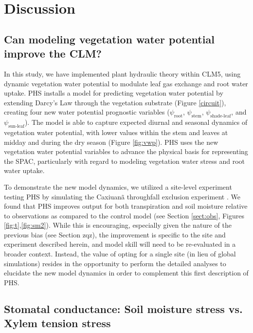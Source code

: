 \documentclass[draft,linenumbers]{agujournal}
\begin{document}
\section{Discussion}
\subsection{Can modeling vegetation water potential improve the CLM?}

    In this study, we have implemented plant hydraulic theory within CLM5, 
    using dynamic vegetation water potential to modulate leaf gas exchange and root water uptake.
    PHS installs a model for predicting vegetation water potential by extending Darcy's Law through the vegetation substrate (Figure \ref{circuit}), 
    creating four new water potential prognostic variables ($\psi_{\text{root}}$, $\psi_{\text{stem}}$, $\psi_{\text{shade-leaf}}$, and $\psi_{\text{sun-leaf}}$).  
    The model is able to capture expected diurnal and seasonal dynamics of vegetation water potential, 
    with lower values within the stem and leaves at midday and during the dry season (Figure \ref{fig:vwp}).
    PHS uses the new vegetation water potential variables to advance the physical basis for representing the SPAC, particularly with regard to modeling vegetation water stress and root water uptake.
    
    To demonstrate the new model dynamics, we utilized a site-level experiment testing PHS by simulating the Caxiuan\~a throughfall exclusion experiment \citep{fisher2007}.
    We found that PHS improves output for both transpiration and soil moisture relative to observations as compared to the control model (see Section \ref{sect:obs}, Figures \ref{fig:t},\ref{fig:sm2}).
    While this is encouraging, especially given the nature of the previous bias (see Section zqz), the improvement is specific to the site and experiment described herein, and model skill will need to be re-evaluated in a broader context.
    Instead, the value of opting for a single site (in lieu of global simulations) resides in the opportunity to perform the detailed analyses to elucidate the new model dynamics in order to complement this first description of PHS.
    

\subsection{Stomatal conductance: Soil moisture stress vs. Xylem tension stress}
    \label{sect:stress}
    
\end{document}

